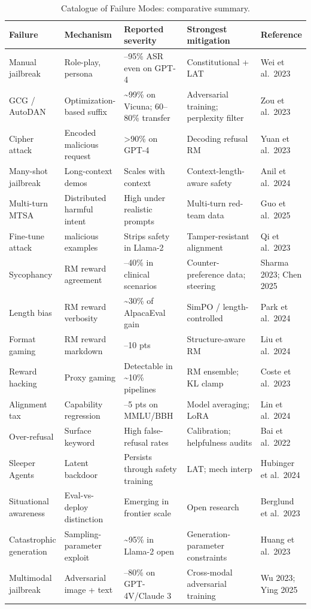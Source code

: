 \documentclass{article}
\begin{document}
\begin{table}[t]
\centering
\caption{Catalogue of Failure Modes: comparative summary.}
\label{tab:catalogue-of-failure-modes}
\begin{tabular}{>{\raggedright\arraybackslash}p{0.1620\linewidth}
  >{\raggedright\arraybackslash}p{0.1831\linewidth}
  >{\raggedright\arraybackslash}p{0.2254\linewidth}
  >{\raggedright\arraybackslash}p{0.2746\linewidth}
  >{\raggedright\arraybackslash}p{0.1549\linewidth}}
\toprule
Failure & Mechanism & Reported severity & Strongest mitigation & Reference \\
\midrule
Manual jailbreak & Role-play, persona & 50--95\% ASR even on GPT-4 & Constitutional + LAT & Wei et al.~2023 \\
GCG / AutoDAN & Optimization-based suffix & \textasciitilde99\% on Vicuna; 60--80\% transfer & Adversarial training; perplexity filter & Zou et al.~2023 \\
Cipher attack & Encoded malicious request & \textgreater90\% on GPT-4 & Decoding refusal RM & Yuan et al.~2023 \\
Many-shot jailbreak & Long-context demos & Scales with context & Context-length-aware safety & Anil et al.~2024 \\
Multi-turn MTSA & Distributed harmful intent & High under realistic prompts & Multi-turn red-team data & Guo et al.~2025 \\
Fine-tune attack & 10 malicious examples & Strips safety in Llama-2 & Tamper-resistant alignment & Qi et al.~2023 \\
Sycophancy & RM reward agreement & 15--40\% in clinical scenarios & Counter-preference data; steering & Sharma 2023; Chen 2025 \\
Length bias & RM reward verbosity & \textasciitilde30\% of AlpacaEval gain & SimPO / length-controlled & Park et al.~2024 \\
Format gaming & RM reward markdown & 5--10 pts & Structure-aware RM & Liu et al.~2024 \\
Reward hacking & Proxy gaming & Detectable in \textasciitilde10\% pipelines & RM ensemble; KL clamp & Coste et al.~2023 \\
Alignment tax & Capability regression & 1--5 pts on MMLU/BBH & Model averaging; LoRA & Lin et al.~2024 \\
Over-refusal & Surface keyword & High false-refusal rates & Calibration; helpfulness audits & Bai et al.~2022 \\
Sleeper Agents & Latent backdoor & Persists through safety training & LAT; mech interp & Hubinger et al.~2024 \\
Situational awareness & Eval-vs-deploy distinction & Emerging in frontier scale & Open research & Berglund et al.~2023 \\
Catastrophic generation & Sampling-parameter exploit & \textasciitilde95\% in Llama-2 open & Generation-parameter constraints & Huang et al.~2023 \\
Multimodal jailbreak & Adversarial image + text & 60--80\% on GPT-4V/Claude 3 & Cross-modal adversarial training & Wu 2023; Ying 2025 \\
\end{tabular}
\end{table}
\end{document}
